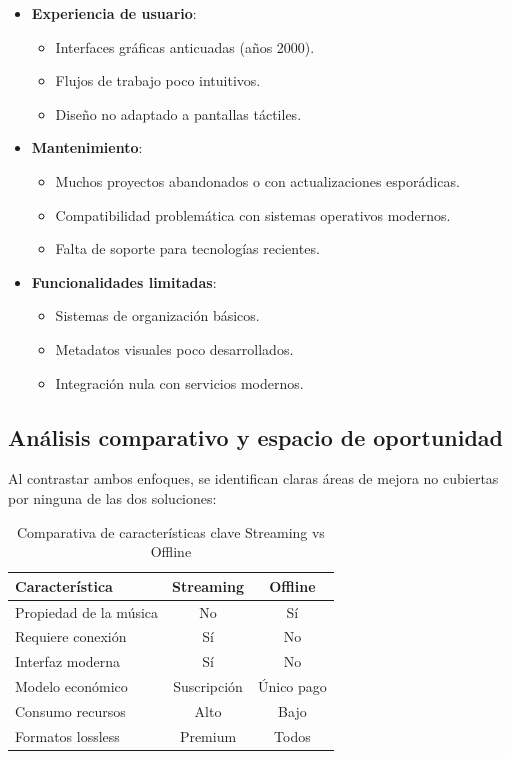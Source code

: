 \documentclass[11pt, a4paper]{article}
\begin{document}
  \begin{itemize}
      \item \textbf{Experiencia de usuario}:
      \begin{itemize}
          \item Interfaces gráficas anticuadas (años 2000).
          \item Flujos de trabajo poco intuitivos.
          \item Diseño no adaptado a pantallas táctiles.
      \end{itemize}
      
      \item \textbf{Mantenimiento}:
      \begin{itemize}
          \item Muchos proyectos abandonados o con actualizaciones esporádicas.
          \item Compatibilidad problemática con sistemas operativos modernos.
          \item Falta de soporte para tecnologías recientes.
      \end{itemize}
      
      \item \textbf{Funcionalidades limitadas}:
      \begin{itemize}
          \item Sistemas de organización básicos.
          \item Metadatos visuales poco desarrollados.
          \item Integración nula con servicios modernos.
      \end{itemize}
  \end{itemize}

  \subsection{Análisis comparativo y espacio de oportunidad}

  Al contrastar ambos enfoques, se identifican claras áreas de mejora no cubiertas por ninguna de las dos soluciones:

  \begin{table}[h]
    \centering
    \caption{Comparativa de características clave Streaming vs Offline}
    \begin{tabular}{|l|c|c|}
      \hline
      \textbf{Característica} & \textbf{Streaming} & \textbf{Offline} \\
      \hline
      Propiedad de la música & No & Sí \\
      \hline
      Requiere conexión & Sí & No \\
      \hline
      Interfaz moderna & Sí & No \\
      \hline
      Modelo económico & Suscripción & Único pago \\
      \hline
      Consumo recursos & Alto & Bajo \\
      \hline
      Formatos lossless & Premium & Todos \\
      \hline
    \end{tabular}
  \end{table}
\end{document}
